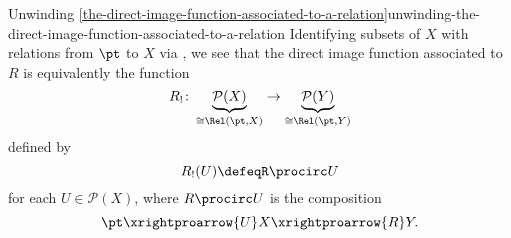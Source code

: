 \begin{remark}{Unwinding \cref{the-direct-image-function-associated-to-a-relation}}{unwinding-the-direct-image-function-associated-to-a-relation}%
    Identifying subsets of $X$ with relations from $\pt$ to $X$ via , we see that the direct image function associated to $R$ is equivalently the function
    \[
        R_{!}%
        \colon%
        \underbrace{\mathcal{P}(X)}_{\cong\Rel(\pt,X)}
        \to%
        \underbrace{\mathcal{P}(Y)}_{\cong\Rel(\pt,Y)}%
    \]%
    defined by
    \[
        R_{!}(U)%
        \defeq%
        R\procirc U%
    \]%
    for each $U\in\mathcal{P}(X)$, where $R\procirc U$ is the composition
    \[
        \pt%
        \xrightproarrow{U}%
        X%
        \xrightproarrow{R}%
        Y.
    \]%
\end{remark}
